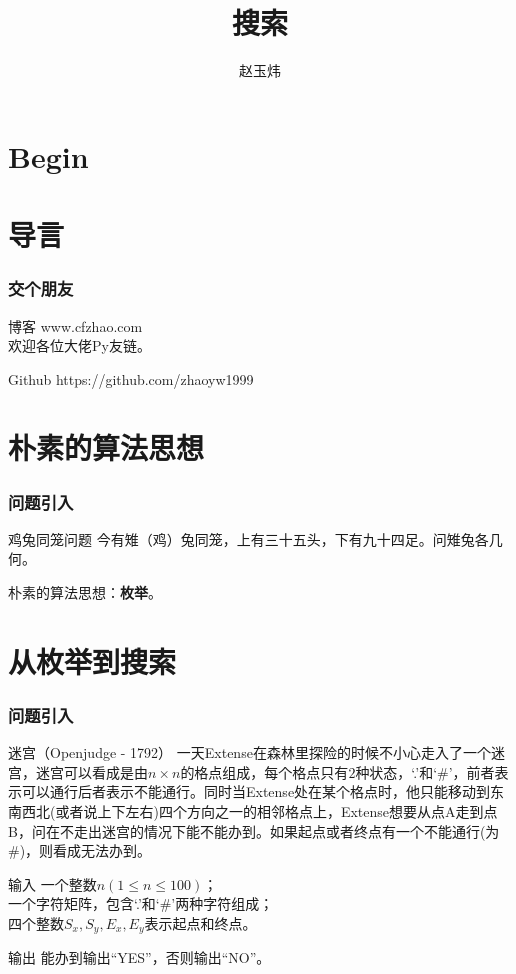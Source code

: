 \documentclass[11pt]{beamer}
\author{赵玉炜}
\title{搜索}
\institute[NJUPT.SAST]{软件研发中心，ACM组}
\date{}
\begin{document}
	\section{Begin}
	\begin{frame}
  \titlepage
  \end{frame}

  \section{导言}
  \begin{frame}[c]
  \frametitle{交个朋友}
    \begin{block}{博客}
    	www.cfzhao.com \\
    	欢迎各位大佬Py友链。
    \end{block}
    \begin{block}{Github}
    	https://github.com/zhaoyw1999
    \end{block}
  \end{frame}

  \section{朴素的算法思想}
  \begin{frame}[c]
    \frametitle{问题引入}
    \begin{block}{鸡兔同笼问题}
      今有雉（鸡）兔同笼，上有三十五头，下有九十四足。问雉兔各几何。
    \end{block}
    \vspace{0.5cm}
    朴素的算法思想：\textbf{枚举}。
  \end{frame}

  \section{从枚举到搜索}
  \begin{frame}[c]
    \frametitle{问题引入}
    \begin{block}{迷宫（Openjudge - 1792）}
      一天Extense在森林里探险的时候不小心走入了一个迷宫，迷宫可以看成是由$n \times n$的格点组成，每个格点只有$2$种状态，`.'和`\#'，前者表示可以通行后者表示不能通行。同时当Extense处在某个格点时，他只能移动到东南西北(或者说上下左右)四个方向之一的相邻格点上，Extense想要从点A走到点B，问在不走出迷宫的情况下能不能办到。如果起点或者终点有一个不能通行(为\#)，则看成无法办到。
    \end{block}
    \begin{block}{输入}
      一个整数$n(1 \leq n \leq 100)$；\\
      一个字符矩阵，包含`.'和`\#'两种字符组成；\\
      四个整数$S_x,S_y,E_x,E_y$表示起点和终点。
    \end{block}
    \begin{block}{输出}
      能办到输出“YES”，否则输出“NO”。
    \end{block}
  \end{frame}
\end{document}
